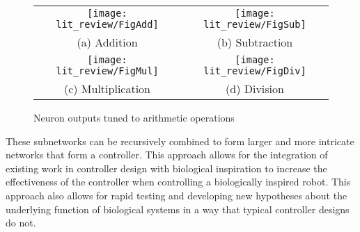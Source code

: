 \begin{figure}
\centering
\begin{tabular}{cc}
\texttt{[image: lit\_review/FigAdd]} &
\texttt{[image: lit\_review/FigSub]} \\
(a) Addition & (b) Subtraction \\
\texttt{[image: lit\_review/FigMul]} &
\texttt{[image: lit\_review/FigDiv]} \\
(c) Multiplication & (d) Division \\
\end{tabular}
\caption{Neuron outputs tuned to arithmetic operations}
\label{fig:MathOutputs}
\end{figure}

These subnetworks can be recursively combined to form larger and more intricate
networks that form a controller. This approach allows for the integration of
existing work in controller design with biological inspiration to increase the
effectiveness of the controller when controlling a biologically inspired robot.
This approach also allows for rapid testing and developing new hypotheses about the underlying function of biological systems in a way that typical controller designs do not.
